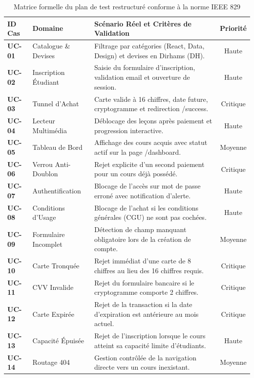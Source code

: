 \documentclass[11pt, a4paper, openany]{report}
\begin{document}
\begin{table}[h]
\centering
\renewcommand{\arraystretch}{1.2}
\small
\begin{tabularx}{\textwidth}{|l|l|X|c|}
\hline
\rowcolor{primary!20}
\textbf{ID Cas} & \textbf{Domaine} & \textbf{Scénario Réel et Critères de Validation} & \textbf{Priorité} \\ \hline
\textbf{UC-01} & Catalogue \& Devises & Filtrage par catégories (React, Data, Design) et devises en Dirhams (DH). & Haute \\ \hline
\textbf{UC-02} & Inscription Étudiant & Saisie du formulaire d'inscription, validation email et ouverture de session. & Haute \\ \hline
\textbf{UC-03} & Tunnel d'Achat & Carte valide à 16 chiffres, date future, cryptogramme et redirection /success. & Critique \\ \hline
\textbf{UC-04} & Lecteur Multimédia & Déblocage des leçons après paiement et progression interactive. & Haute \\ \hline
\textbf{UC-05} & Tableau de Bord & Affichage des cours acquis avec statut actif sur la page /dashboard. & Moyenne \\ \hline
\textbf{UC-06} & Verrou Anti-Doublon & Rejet explicite d'un second paiement pour un cours déjà possédé. & Critique \\ \hline
\textbf{UC-07} & Authentification & Blocage de l'accès sur mot de passe erroné avec notification d'alerte. & Haute \\ \hline
\textbf{UC-08} & Conditions d'Usage & Blocage de l'achat si les conditions générales (CGU) ne sont pas cochées. & Haute \\ \hline
\textbf{UC-09} & Formulaire Incomplet & Détection de champ manquant obligatoire lors de la création de compte. & Moyenne \\ \hline
\textbf{UC-10} & Carte Tronquée & Rejet immédiat d'une carte de 8 chiffres au lieu des 16 chiffres requis. & Critique \\ \hline
\textbf{UC-11} & CVV Invalide & Rejet du formulaire bancaire si le cryptogramme comporte 2 chiffres. & Critique \\ \hline
\textbf{UC-12} & Carte Expirée & Rejet de la transaction si la date d'expiration est antérieure au mois actuel. & Critique \\ \hline
\textbf{UC-13} & Capacité Épuisée & Rejet de l'inscription lorsque le cours atteint sa capacité limite d'étudiants. & Haute \\ \hline
\textbf{UC-14} & Routage 404 & Gestion contrôlée de la navigation directe vers un cours inexistant. & Moyenne \\ \hline
\end{tabularx}
\caption{Matrice formelle du plan de test restructuré conforme à la norme IEEE 829}
\end{table}
\end{document}
